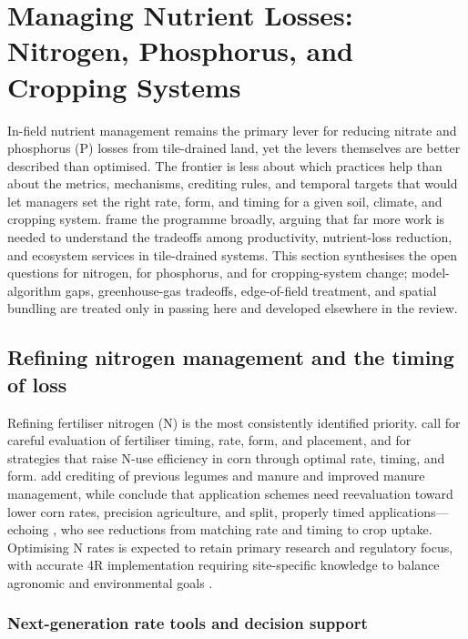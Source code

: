 \section{Managing Nutrient Losses: Nitrogen, Phosphorus, and Cropping Systems}

In-field nutrient management remains the primary lever for reducing nitrate
and phosphorus (P) losses from tile-drained land, yet the levers themselves are
better described than optimised. The frontier is less about which practices
help than about the metrics, mechanisms, crediting rules, and temporal targets
that would let managers set the right rate, form, and timing for a given soil,
climate, and cropping system. \textcite{Ma2025} frame the programme broadly,
arguing that far more work is needed to understand the tradeoffs among
productivity, nutrient-loss reduction, and ecosystem services in tile-drained
systems. This section synthesises the open questions for nitrogen, for
phosphorus, and for cropping-system change; model-algorithm gaps,
greenhouse-gas tradeoffs, edge-of-field treatment, and spatial bundling are
treated only in passing here and developed elsewhere in the review.

\subsection{Refining nitrogen management and the timing of loss}

Refining fertiliser nitrogen (N) is the most consistently identified priority.
\textcite{ROSSI1991} call for careful evaluation of fertiliser timing, rate,
form, and placement, and \textcite{Zhao2000} for strategies that raise N-use
efficiency in corn through optimal rate, timing, and form. \textcite{Randall2001}
add crediting of previous legumes and manure and improved manure management,
while \textcite{Dattamudi2020} conclude that application schemes need
reevaluation toward lower corn rates, precision agriculture, and split, properly
timed applications---echoing \textcite{Elmi2002}, who see reductions from
matching rate and timing to crop uptake. Optimising N rates is expected to
retain primary research and regulatory focus, with accurate 4R implementation
requiring site-specific knowledge to balance agronomic and environmental goals
\parencite{Christianson2015b}.

\subsubsection{Next-generation rate tools and decision support}

